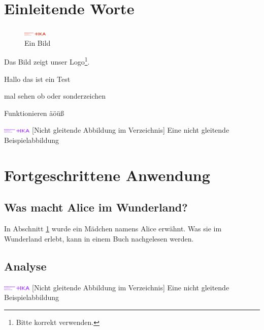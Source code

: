 

\section{Einleitende Worte}
\label{sec:einleitende-worte}


\begin{figure}
  \centering
  \includegraphics[width=0.1\textwidth]{figures/HKA_Logo.png}
  \caption{Ein Bild}
\end{figure}
Das Bild zeigt unser Logo\footnote{Bitte korrekt verwenden.}.


Hallo das ist ein Test

mal sehen ob oder sonderzeichen

Funktionieren äöüß \parencite[Vgl.][9-26]{Tibi2011}

\begin{center}
  \includegraphics[width=0.1\textwidth]{figures/HKA_Logo_Lila.png}
      [Nicht gleitende Abbildung im Verzeichnis]
      {Eine nicht gleitende Beispielabbildung}
\end{center}

\section{Fortgeschrittene Anwendung}
\label{sec:fortg-anwend}

\subsection{Was macht Alice im Wunderland?}
\label{sec:was-macht-alice}

In Abschnitt \ref{sec:einleitende-worte} wurde ein Mädchen namens
Alice erwähnt. Was sie im Wunderland erlebt, kann in einem Buch
nachgelesen werden.

\subsection{Analyse}
\label{sec:analyse}

\begin{center}
  \includegraphics[width=0.1\textwidth]{figures/HKA_Logo_Lila.png}
      [Nicht gleitende Abbildung im Verzeichnis]
      {Eine nicht gleitende Beispielabbildung}
\end{center}


